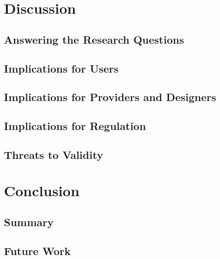 \documentclass[twoside,its]{bossthesis}
\begin{document}
\chapter{Discussion}
\label{ch:discussion}

\section{Answering the Research Questions}

\section{Implications for Users}

\section{Implications for Providers and Designers}

\section{Implications for Regulation}

\section{Threats to Validity}



\chapter{Conclusion}
\label{ch:conclusion}

\section{Summary}

\section{Future Work}



\cleardoublepage
\pagestyle{fancy-lists}

{}%
\chaptermark{\listoftitlename}
\end{document}
